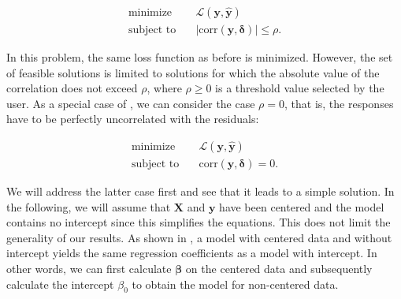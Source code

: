 \documentclass[utf8]{frontiersSCNS} %
\renewcommand{\b}{\boldsymbol{\beta}} %
\newcommand{\corr}{\text{corr}}
\renewcommand{\d}{\boldsymbol{\delta}}
\renewcommand{\L}{\mathcal{L}}
\newcommand{\x}{\mathbf{x}}
\newcommand{\X}{\mathbf{X}}
\newcommand{\y}{\mathbf{y}}
\newcommand{\yh}{\mathbf{\hat{y}}}
\begin{document}
\begin{equation}\label{eq:constrained_problem_bounded}
\begin{split}
    \text{minimize}\quad& \L(\y,\yh)\\
\text{subject to}\quad&   |\corr(\y,\d)| \le \rho.
\end{split}
\end{equation}

In this problem, the same loss function as before is minimized. However, the set of feasible solutions is limited to solutions for which the absolute value of the correlation does not exceed $\rho$, where $\rho\ge0$ is a threshold value selected by the user. As a special case of , we can consider the case $\rho=0$, that is, the responses have to be perfectly uncorrelated with the residuals: 

\begin{equation}\label{eq:constrained_problem_zero}
\begin{split}
    \text{minimize}\quad& \L(\y,\yh)\\
    \text{subject to}\quad&  \corr(\y,\d) = 0.
\end{split}
\end{equation}

We will address the latter case first and see that it leads to a simple solution. In the following, we will assume that $\X$ and $\y$ have been centered and the model contains no intercept since this simplifies the equations.  This does not limit the generality of our results. As shown in , a model with centered data and without intercept yields the same regression coefficients as a model with intercept. In other words, we can first calculate $\b$ on the centered data and subsequently calculate the intercept $\beta_0$ to obtain the model for non-centered data.




\end{document}
